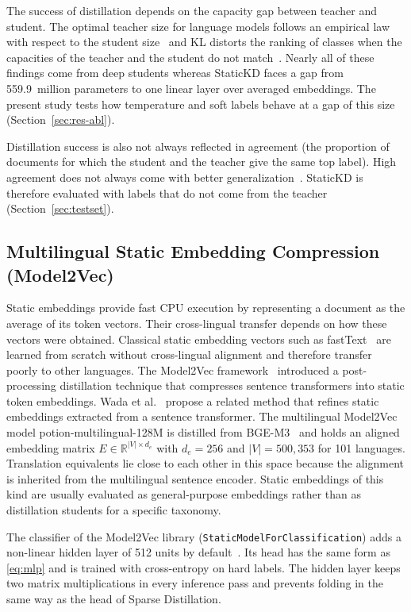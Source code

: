 \documentclass{ieeeaccess}
\begin{document}
The success of distillation depends on the capacity gap between teacher and student. The optimal teacher size for language models follows an empirical law with respect to the student size~\cite{zhang2025law} and KL distorts the ranking of classes when the capacities of the teacher and the student do not match~\cite{wang2026rckd}. Nearly all of these findings come from deep students whereas StaticKD faces a gap from 559.9~million parameters to one linear layer over averaged embeddings. The present study tests how temperature and soft labels behave at a gap of this size (Section~\ref{sec:res-abl}).

Distillation success is also not always reflected in agreement (the proportion of documents for which the student and the teacher give the same top label). High agreement does not always come with better generalization~\cite{stanton2021kd}. StaticKD is therefore evaluated with labels that do not come from the teacher (Section~\ref{sec:testset}).

\subsection{Multilingual Static Embedding Compression (Model2Vec)}
\label{sec:rw-static}
Static embeddings provide fast CPU execution by representing a document as the average of its token vectors. Their cross-lingual transfer depends on how these vectors were obtained. Classical static embedding vectors such as fastText~\cite{joulin2017bag} are learned from scratch without cross-lingual alignment and therefore transfer poorly to other languages. The Model2Vec framework~\cite{tulkens2024model2vec} introduced a post-processing distillation technique that compresses sentence transformers into static token embeddings. Wada et al.~\cite{wada2025static} propose a related method that refines static embeddings extracted from a sentence transformer. The multilingual Model2Vec model potion-multilingual-128M is distilled from BGE-M3~\cite{chen2024bgem3} and holds an aligned embedding matrix $E\in\mathbb{R}^{|V|\times d_e}$ with $d_e=256$ and $|V|=500{,}353$ for 101 languages. Translation equivalents lie close to each other in this space because the alignment is inherited from the multilingual sentence encoder. Static embeddings of this kind are usually evaluated as general-purpose embeddings rather than as distillation students for a specific taxonomy.

The classifier of the Model2Vec library (\texttt{StaticModelForClassification}) adds a non-linear hidden layer of 512 units by default~\cite{tulkens2024model2vec}. Its head has the same form as \eqref{eq:mlp} and is trained with cross-entropy on hard labels. The hidden layer keeps two matrix multiplications in every inference pass and prevents folding in the same way as the head of Sparse Distillation.
\end{document}
